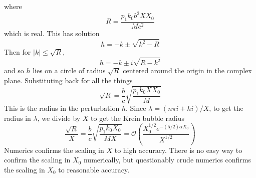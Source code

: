 \documentclass[thesis.tex]{subfiles}
\begin{document}
where 
\[
R = \frac{p_1 k_0 b^2 X X_0 }{M c^2}
\]
which is real. This has solution
\[
h = -k \pm \sqrt{k^2 - R}
\]
Then for $|k| \leq \sqrt{R}$,
\[
h = -k \pm i \sqrt{R - k^2}
\]
and so $h$ lies on a circle of radius $\sqrt{R}$ centered around the origin in the complex plane. Substituting back for all the things
\[
\sqrt{R} = \frac{b}{c} \sqrt{\frac{p_1 k_0 X X_0 }{M} }
\]
This is the radius in the perturbation $h$. Since $\lambda = (n \pi i + h i)/X$, to get the radius in $\lambda$, we divide by $X$ to get the Krein bubble radius
\[
\frac{\sqrt{R}}{X} = \frac{b}{c} \sqrt{\frac{p_1 k_0 X_0 }{M X} } = \mathcal{O}\left(\frac{ X_0^{1/2} e^{-(5/2) \alpha X_0} }{X^{1/2}} \right)
\] 
Numerics confirms the scaling in $X$ to high accuracy. There is no easy way to confirm the scaling in $X_0$ numerically, but questionably crude numerics confirms the scaling in $X_0$ to reasonable accuracy.
\end{document}
